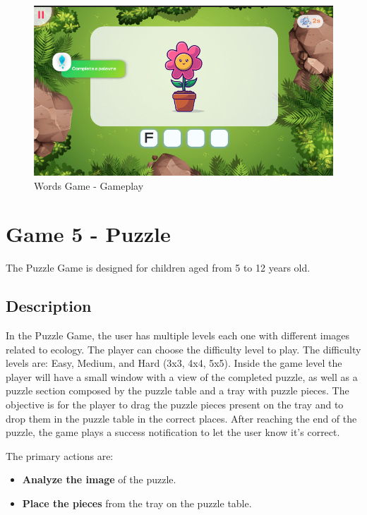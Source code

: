 \begin{figure}[H]
    \centering
    \includegraphics[width=0.9\linewidth]{Chapters/gameplay/WordsGame.jpg}
    \caption{Words Game - Gameplay}
    \label{fig:wordsGameplay}    
\end{figure}

\newpage
\section{Game 5 - Puzzle}
\label{c3Puzzle}

The Puzzle Game is designed for children aged from 5 to 12 years old.

\subsection*{Description}

In the Puzzle Game, the user has multiple levels each one with different images related to ecology. The player can choose the difficulty level to play. The difficulty levels are: Easy, Medium, and Hard (3x3, 4x4, 5x5). Inside the game level the player will have a small window with a view of the completed puzzle, as well as a puzzle section composed by the puzzle table and a tray with puzzle pieces.
The objective is for the player to drag the puzzle pieces present on the tray and to drop them in the puzzle table in the correct places. After reaching the end of the puzzle, the game plays a success notification to let the user know it's correct.

The primary actions are:

\begin{itemize}
    \item \textbf{Analyze the image} of the puzzle.
    \item \textbf{Place the pieces} from the tray on the puzzle table.
\end{itemize}

